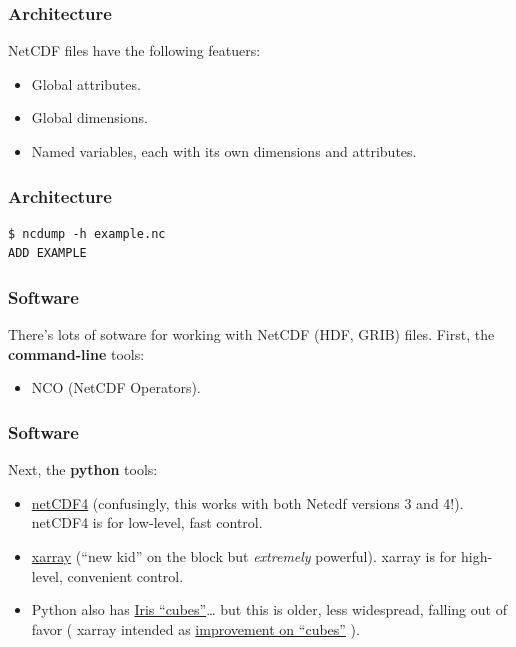 \documentclass[aspectratio=169]{beamer}
\begin{document}
\begin{frame}

  \frametitle{Architecture}

  NetCDF files have the following featuers:
  \begin{itemize}
    \item
      Global attributes.
    \item
      Global dimensions.
    \item
      Named variables, each with its own
      dimensions and attributes.
  \end{itemize}

\end{frame}

\begin{frame}[fragile]

  \frametitle{Architecture}

\begin{verbatim}
$ ncdump -h example.nc
ADD EXAMPLE
\end{verbatim}

\end{frame}



\begin{frame}
  \frametitle{Software}

  There's lots of sotware for working with NetCDF (HDF, GRIB) files.
  First, the \textbf{command-line} tools:
  \begin{itemize}
    \item
      NCO ({\color{red}N}et{\color{red}C}DF {\color{red}O}perators).
  \end{itemize}

\end{frame}

\begin{frame}
  \frametitle{Software}

  Next, the \textbf{python} tools:
  \begin{itemize}
    \item
      \href{https://unidata.github.io/netcdf4-python/}{netCDF4}
      (confusingly, this works with both Netcdf versions 3 and 4!).
      netCDF4 is for {\color{red}low-level, fast} control.
    \item
      \href{http://xarray.pydata.org/en/stable/}{xarray}
      (``new kid'' on the block but \textit{extremely} powerful).
      xarray is for {\color{red}high-level, convenient} control.
    \item
      Python also has
      \href{https://scitools.org.uk/iris/docs/v1.13.0/userguide/loading_iris_cubes.html}{Iris ``cubes''}\ldots
      but this is older, less widespread, falling out of favor
      (%
      xarray intended as
      \href{http://xarray.pydata.org/en/stable/getting-started-guide/faq.html#what-other-netcdf-related-python-libraries-should-i-know-about}{improvement on ``cubes''}%
      ).
  \end{itemize}
\end{frame}
\end{document}
